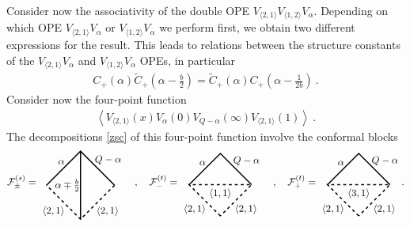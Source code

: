\documentclass[12pt,a4paper,notitlepage]{report}
\numberwithin{equation}{section}
\theoremstyle{break}
\begin{document}
Consider now the associativity of the double OPE
$V_{\langle 2,1 \rangle}V_{\langle 1,2 \rangle}V_\alpha$.
Depending on which OPE $V_{\langle 2,1 \rangle}V_\alpha$ or $V_{\langle 1,2 \rangle}V_\alpha$ we perform first, we obtain two different expressions for the result.
This leads to 
relations between the structure constants of the $V_{\langle 2,1 \rangle}V_\alpha$ and $V_{\langle 1,2 \rangle}V_\alpha$ OPEs, in particular
\begin{align}
 C_+(\alpha)\tilde{C}_+(\alpha-\tfrac{b}{2}) = \tilde{C}_+(\alpha)C_+(\alpha-\tfrac{1}{2b})\ .
\label{ctc}
\end{align}
Consider now the four-point function
\begin{align}
 \left\langle V_{\langle 2,1 \rangle}(x) V_\alpha(0) V_{Q-\alpha}(\infty) V_{\langle 2,1 \rangle}(1)\right\rangle\ .
\label{zvv}
\end{align}
The decompositions \eqref{zsc} of this four-point function involve the conformal blocks
 \begin{align}
\mathcal{F}^{(s)}_\pm = 
\begin{tikzpicture}[baseline=(current  bounding  box.center), very thick, scale = .6]
\draw[dashed] (2, 0) -- node [below right] {\!\!\!$\langle 2,1 \rangle$} (0, -2) -- node [below left] {$\langle 2,1 \rangle$\!\!\!} (-2, 0); 
\draw (-2, 0) -- node [above left] {$\alpha$\!\!\!} (0, 2) -- node [above right] {\!\!\!\!$Q-\alpha$} (2, 0);
\draw (0, -2) -- node [left] {$\alpha\mp \frac{b}{2}\! \! $} (0, 2); 
\end{tikzpicture}
\quad , \quad
 \mathcal{F}^{(t)}_-  =  
 \begin{tikzpicture}[baseline=(current  bounding  box.center), very thick, scale = .55]
\draw (-2, 0) -- node [above left] {$\alpha$\!\!\!} (0, 2) -- node [above right] {\!\!\!\!$Q-\alpha$} (2, 0);
\draw[dashed] (0, -2) -- node [below left] {$\langle 2,1 \rangle$\!\!\!} (-2, 0) -- node [below] {$\langle 1,1 \rangle$} (2, 0) -- node [below right] {\!\!\!$\langle 2,1 \rangle$} (0, -2); 
\end{tikzpicture}
\quad , \quad
 \mathcal{F}^{(t)}_+  =  
 \begin{tikzpicture}[baseline=(current  bounding  box.center), very thick, scale = .55]
\draw (-2, 0) -- node [above left] {$\alpha$\!\!\!} (0, 2) -- node [above right] {\!\!\!\!$Q-\alpha$} (2, 0);
\draw[dashed] (0, -2) -- node [below left] {$\langle 2,1 \rangle$\!\!\!} (-2, 0) -- node [below] {$\langle 3,1 \rangle$} (2, 0) -- node [below right] {\!\!\!$\langle 2,1 \rangle$} (0, -2); 
\end{tikzpicture}
.
\end{align}
\end{document}
